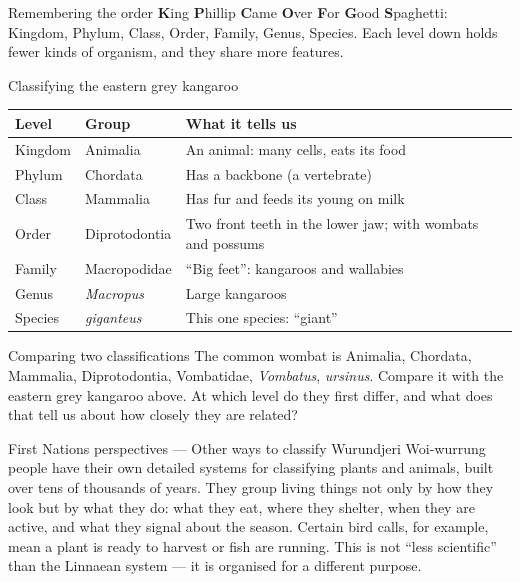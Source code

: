 \begin{skillbox}{Remembering the order}
\textbf{K}ing \textbf{P}hillip \textbf{C}ame \textbf{O}ver \textbf{F}or \textbf{G}ood \textbf{S}paghetti: Kingdom, Phylum, Class, Order, Family, Genus, Species. Each level down holds fewer kinds of organism, and they share more features.
\end{skillbox}

\begin{workedex}{Classifying the eastern grey kangaroo}
\renewcommand{\arraystretch}{1.15}
\begin{tabular}{@{}p{1.6cm}p{2.5cm}p{5.6cm}@{}}
\textbf{Level} & \textbf{Group} & \textbf{What it tells us} \\ \hline
Kingdom & Animalia & An animal: many cells, eats its food \\
Phylum & Chordata & Has a backbone (a vertebrate) \\
Class & Mammalia & Has fur and feeds its young on milk \\
Order & Diprotodontia & Two front teeth in the lower jaw; with wombats and possums \\
Family & Macropodidae & ``Big feet'': kangaroos and wallabies \\
Genus & \textit{Macropus} & Large kangaroos \\
Species & \textit{giganteus} & This one species: ``giant'' \\
\end{tabular}
\end{workedex}

\begin{wedo}{Comparing two classifications}
The common wombat is Animalia, Chordata, Mammalia, Diprotodontia, Vombatidae, \textit{Vombatus}, \textit{ursinus}. Compare it with the eastern grey kangaroo above. At which level do they first differ, and what does that tell us about how closely they are related?
\answerbox{5cm}
\end{wedo}

\begin{countrybox}{First Nations perspectives --- Other ways to classify}
Wurundjeri Woi-wurrung people have their own detailed systems for classifying plants and animals, built over tens of thousands of years. They group living things not only by how they look but by what they do: what they eat, where they shelter, when they are active, and what they signal about the season. Certain bird calls, for example, mean a plant is ready to harvest or fish are running. This is not ``less scientific'' than the Linnaean system --- it is organised for a different purpose.
\end{countrybox}

